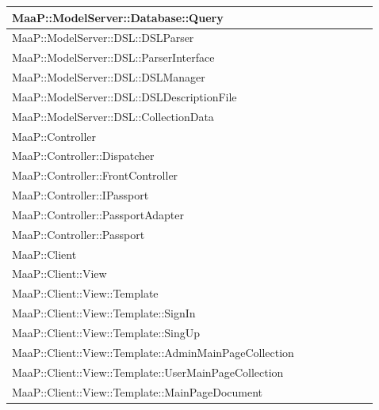 \begin{center}
\begin{longtable}{|p{0.8\linewidth}|c|}
\midrule 
MaaP::ModelServer::Database::Query
& \\

\midrule 
MaaP::ModelServer::DSL::DSLParser
& \\

\midrule 
MaaP::ModelServer::DSL::ParserInterface
& \\

\midrule 
MaaP::ModelServer::DSL::DSLManager
& \\

\midrule 
MaaP::ModelServer::DSL::DSLDescriptionFile
& \\

\midrule 
MaaP::ModelServer::DSL::CollectionData
& \\

\midrule 
MaaP::Controller 
& \\

\midrule 
MaaP::Controller::Dispatcher
& \\

\midrule 
MaaP::Controller::FrontController
& \\

\midrule 
MaaP::Controller::IPassport
& \\

\midrule 
MaaP::Controller::PassportAdapter 
& \\

\midrule 
MaaP::Controller::Passport
& \\

\midrule 
MaaP::Client 
& \\

\midrule 
MaaP::Client::View 
& \\

\midrule 
MaaP::Client::View::Template
& \\

\midrule 
MaaP::Client::View::Template::SignIn
& \\

\midrule 
MaaP::Client::View::Template::SingUp
& \\

\midrule 
MaaP::Client::View::Template::AdminMainPageCollection
& \\

\midrule 
MaaP::Client::View::Template::UserMainPageCollection
& \\

\midrule 
MaaP::Client::View::Template::MainPageDocument
& \\


\end{longtable}
\end{center}
